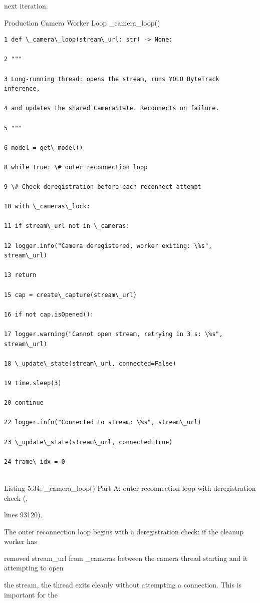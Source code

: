 next iteration.

Production Camera Worker Loop  \_camera\_loop()

\begin{listingbox}
	\begin{verbatim}
1 def \_camera\_loop(stream\_url: str) -> None:

2 """

3 Long-running thread: opens the stream, runs YOLO ByteTrack inference,

4 and updates the shared CameraState. Reconnects on failure.

5 """

6 model = get\_model()

8 while True: \# outer reconnection loop

9 \# Check deregistration before each reconnect attempt

10 with \_cameras\_lock:

11 if stream\_url not in \_cameras:

12 logger.info("Camera deregistered, worker exiting: \%s", stream\_url)

13 return

15 cap = create\_capture(stream\_url)

16 if not cap.isOpened():

17 logger.warning("Cannot open stream, retrying in 3 s: \%s", stream\_url)

18 \_update\_state(stream\_url, connected=False)

19 time.sleep(3)

20 continue

22 logger.info("Connected to stream: \%s", stream\_url)

23 \_update\_state(stream\_url, connected=True)

24 frame\_idx = 0


\end{verbatim}
\end{listingbox}
Listing 5.34: \_camera\_loop() Part A: outer reconnection loop with deregistration check (,

lines 93120).

The outer reconnection loop begins with a deregistration check: if the cleanup worker has

removed stream\_url from \_cameras between the camera thread starting and it attempting to open

the stream, the thread exits cleanly without attempting a connection. This is important for the

